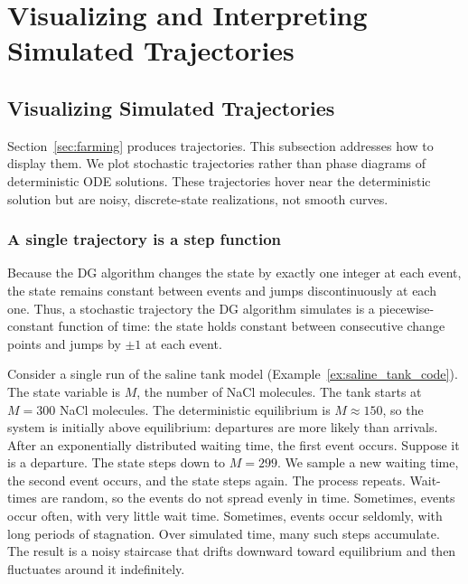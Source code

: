 \section{Visualizing and Interpreting Simulated Trajectories}\label{sec:visualizing_interpreting}


\subsection{Visualizing Simulated Trajectories}\label{subsec:visualizing}

Section~\ref{sec:farming} produces trajectories. This subsection addresses how to display them. We plot stochastic trajectories rather than phase diagrams of deterministic ODE solutions. These trajectories hover near the deterministic solution but are noisy, discrete-state realizations, not smooth curves.

\subsubsection{A single trajectory is a step function}\label{subsubsec:single_traj_step}

Because the DG algorithm changes the state by exactly one integer at each event, the state remains constant between events and jumps discontinuously at each one. Thus, a stochastic trajectory the DG algorithm simulates is a piecewise-constant function of time: the state holds constant between consecutive change points and jumps by $\pm 1$ at each event.

Consider a single run of the saline tank model (Example~\ref{ex:saline_tank_code}). The state variable is $M$, the number of NaCl molecules. The tank starts at $M = 300$ NaCl molecules. The deterministic equilibrium is $M \approx 150$, so the system is initially above equilibrium: departures are more likely than arrivals. After an exponentially distributed waiting time, the first event occurs. Suppose it is a departure. The state steps down to $M = 299$. We sample a new waiting time, the second event occurs, and the state steps again. The process repeats. Wait-times are random, so the events do not spread evenly in time. Sometimes, events occur often, with very little wait time. Sometimes, events occur seldomly, with long periods of stagnation. Over simulated time, many such steps accumulate. The result is a noisy staircase that drifts downward toward equilibrium and then fluctuates around it indefinitely.

